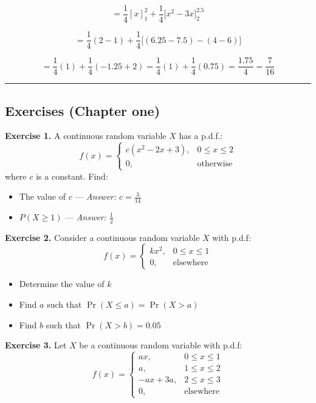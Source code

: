 \documentclass[
]{article}
\providecommand{\tightlist}{%
  \setlength{\itemsep}{0pt}\setlength{\parskip}{0pt}}
\begin{document}
\[= \frac{1}{4}[x]_1^2 + \frac{1}{4}\big[x^2-3x\big]_2^{2.5}\]

\[= \frac{1}{4}(2-1) + \frac{1}{4}\big[(6.25-7.5)-(4-6)\big]\]

\[= \frac{1}{4}(1) + \frac{1}{4}(-1.25+2) = \frac{1}{4}(1) + \frac{1}{4}(0.75) = \frac{1.75}{4} = \frac{7}{16}\]

\begin{center}\rule{0.5\linewidth}{0.5pt}\end{center}

\subsection{Exercises (Chapter one)}\label{exercises-chapter-one}

\textbf{Exercise 1.} A continuous random variable \(X\) has a p.d.f.:
\[f(x) = \begin{cases} c(x^2 - 2x + 3), & 0 \leq x \leq 2 \\ 0, & \text{otherwise} \end{cases}\]
where \(c\) is a constant. Find:

\begin{itemize}
\tightlist
\item
  The value of \(c\) --- \emph{Answer:} \(c = \frac{3}{14}\)
\item
  \(P(X \geq 1)\) --- \emph{Answer:} \(\frac{1}{2}\)
\end{itemize}

\textbf{Exercise 2.} Consider a continuous random variable \(X\) with
p.d.f:
\[f(x) = \begin{cases} kx^2, & 0 \leq x \leq 1 \\ 0, & \text{elsewhere} \end{cases}\]

\begin{itemize}
\tightlist
\item
  Determine the value of \(k\)
\item
  Find \(a\) such that \(\Pr(X \leq a) = \Pr(X > a)\)
\item
  Find \(b\) such that \(\Pr(X > b) = 0.05\)
\end{itemize}

\textbf{Exercise 3.} Let \(X\) be a continuous random variable with
p.d.f:
\[f(x) = \begin{cases} ax, & 0 \leq x \leq 1 \\ a, & 1 \leq x \leq 2 \\ -ax+3a, & 2 \leq x \leq 3 \\ 0, & \text{elsewhere} \end{cases}\]
\end{document}
